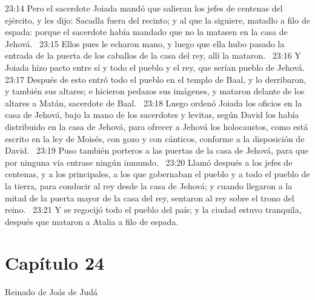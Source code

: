 																							23:14 Pero el sacerdote Joiada mandó que salieran los jefes de centenas del ejército, y les dijo: Sacadla fuera del recinto; y al que la siguiere, matadlo a filo de espada: porque el sacerdote había mandado que no la matasen en la casa de Jehová.  
																							23:15 Ellos pues le echaron mano, y luego que ella hubo pasado la entrada de la puerta de los caballos de la casa del rey, allí la mataron.  
																							23:16 Y Joiada hizo pacto entre sí y todo el pueblo y el rey, que serían pueblo de Jehová.  
																							23:17 Después de esto entró todo el pueblo en el templo de Baal, y lo derribaron, y también sus altares; e hicieron pedazos sus imágenes, y mataron delante de los altares a Matán, sacerdote de Baal.  
																							23:18 Luego ordenó Joiada los oficios en la casa de Jehová, bajo la mano de los sacerdotes y levitas, según David los había distribuido en la casa de Jehová, para ofrecer a Jehová los holocaustos, como está escrito en la ley de Moisés, con gozo y con cánticos, conforme a la disposición de David.  
																							23:19 Puso también porteros a las puertas de la casa de Jehová, para que por ninguna vía entrase ningún inmundo.  
																							23:20 Llamó después a los jefes de centenas, y a los principales, a los que gobernaban el pueblo y a todo el pueblo de la tierra, para conducir al rey desde la casa de Jehová; y cuando llegaron a la mitad de la puerta mayor de la casa del rey, sentaron al rey sobre el trono del reino.  
																							23:21 Y se regocijó todo el pueblo del país; y la ciudad estuvo tranquila, después que mataron a Atalia a filo de espada.  
																							\section*{Capítulo 24}
																								Reinado de Joás de Judá  
																								
